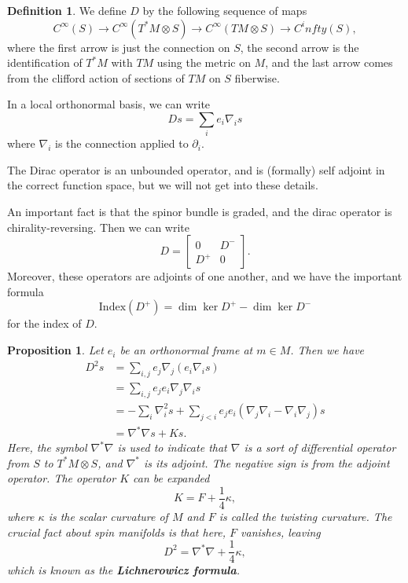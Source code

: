 \documentclass[11pt, reqno]{article}
\theoremstyle{plain}
\newtheorem*{proposition}{Proposition}
\theoremstyle{definition}
\newtheorem*{definition}{Definition}
\theoremstyle{remark}
\begin{document}
\begin{definition}
    We define $D$ by the following sequence of maps 
    \[
        C^\infty(S) \to C^\infty(T^*M \otimes S) \to C^\infty(TM\otimes S) \to C^infty(S),
    \]
    where the first arrow is just the connection on $S$, the second arrow is the identification of $T^*M$
    with $TM$ using the metric on $M$, and the last arrow comes from the clifford action of sections of $TM$
    on $S$ fiberwise. 

    In a local orthonormal basis, we can write
    \[
        Ds = \sum_i e_i \nabla_i s
    \]
    where $\nabla_i$ is the connection applied to $\partial_i$. 

    The Dirac operator is an unbounded operator, and is (formally) self adjoint in the correct 
    function space, but we will not get into these details. 

    An important fact is that the spinor bundle is graded, and the dirac operator is chirality-reversing.
    Then we can write 
    \[
        D = \begin{bmatrix}
            0 & D^-\\
            D^+ & 0
        \end{bmatrix}.
    \]
    Moreover, these operators are adjoints of one another, and we have the important formula
    \[
        \text{Index}(D^+) = \dim\ker D^+ - \dim \ker D^-
    \]
    for the index of $D$.
\end{definition}

\begin{proposition}
    Let $e_i$ be an orthonormal frame at $m \in M$. Then we have
    \begin{align}
        D^2s & = \sum_{i,j}e_j \nabla_j(e_i \nabla_i s)\\
        & = \sum_{i,j}e_j e_i \nabla_j \nabla_i s\\
        & = -\sum_i \nabla_i^2 s + \sum_{j < i} e_j e_i (\nabla_j \nabla_i - \nabla_i \nabla_j)s\\
        & = \nabla^*\nabla s + Ks.
    \end{align}
    Here, the symbol $\nabla^* \nabla$ is used to indicate that $\nabla$ is a sort of differential
    operator from $S$ to $T^*M \otimes S$, and $\nabla^*$ is its adjoint. The negative sign is from
    the adjoint operator. The operator $K$ can be expanded
    \[
        K = F + \frac{1}{4}\kappa,
    \]
    where $\kappa$ is the scalar curvature of $M$ and $F$ is called the twisting curvature.
    The crucial fact about spin manifolds is that here, $F$ vanishes, leaving
    \[
        D^2 = \nabla^*\nabla + \frac{1}{4}\kappa,
    \]
    which is known as the \textbf{Lichnerowicz formula}.
\end{proposition}
\end{document}
